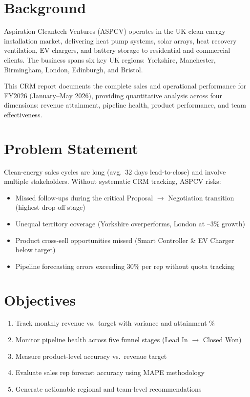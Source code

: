 \documentclass[12pt,a4paper]{report}
\begin{document}
\section{Background}

Aspiration Cleantech Ventures (ASPCV) operates in the UK clean-energy installation market, delivering heat pump systems, solar arrays, heat recovery ventilation, EV chargers, and battery storage to residential and commercial clients. The business spans six key UK regions: Yorkshire, Manchester, Birmingham, London, Edinburgh, and Bristol.

This CRM report documents the complete sales and operational performance for FY2026 (January--May 2026), providing quantitative analysis across four dimensions: revenue attainment, pipeline health, product performance, and team effectiveness.

\section{Problem Statement}

Clean-energy sales cycles are long (avg.\ 32 days lead-to-close) and involve multiple stakeholders. Without systematic CRM tracking, ASPCV risks:
\begin{itemize}[noitemsep]
  \item Missed follow-ups during the critical Proposal $\to$ Negotiation transition (highest drop-off stage)
  \item Unequal territory coverage (Yorkshire overperforms, London at --3\% growth)
  \item Product cross-sell opportunities missed (Smart Controller \& EV Charger below target)
  \item Pipeline forecasting errors exceeding 30\% per rep without quota tracking
\end{itemize}

\section{Objectives}

\begin{enumerate}[noitemsep]
  \item Track monthly revenue vs.\ target with variance and attainment \%
  \item Monitor pipeline health across five funnel stages (Lead In $\to$ Closed Won)
  \item Measure product-level accuracy vs.\ revenue target
  \item Evaluate sales rep forecast accuracy using MAPE methodology
  \item Generate actionable regional and team-level recommendations
\end{enumerate}
\end{document}
